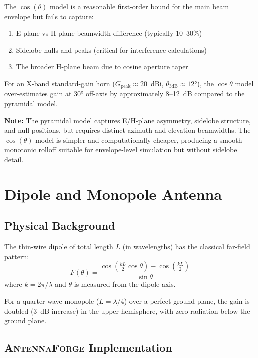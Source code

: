 \documentclass[11pt,a4paper]{article}
\newcommand{\AF}{\textsc{AntennaForge}}
\newcommand{\caveat}[1]{\par\noindent\colorbox{highlightyellow}{\parbox{\dimexpr\linewidth-2\fboxsep\relax}{\textbf{Note:} #1}}\par\medskip}
\begin{document}
The $\cos(\theta)$ model is a reasonable first-order bound for the main beam
envelope but fails to capture:
\begin{enumerate}[leftmargin=2em]
  \item E-plane vs H-plane beamwidth difference (typically 10--30\%)
  \item Sidelobe nulls and peaks (critical for interference calculations)
  \item The broader H-plane beam due to cosine aperture taper
\end{enumerate}

For an X-band standard-gain horn ($G_{\text{peak}} \approx 20$~dBi,
$\theta_{3\text{dB}} \approx 12°$), the $\cos\theta$ model over-estimates gain
at $30°$ off-axis by approximately 8--12~dB compared to the pyramidal model.

\caveat{The pyramidal model captures E/H-plane asymmetry, sidelobe structure,
and null positions, but requires distinct azimuth and elevation beamwidths.
The $\cos(\theta)$ model is simpler and computationally cheaper, producing a
smooth monotonic rolloff suitable for envelope-level simulation but without
sidelobe detail.}

\section{Dipole and Monopole Antenna}
\label{sec:dipole}

\subsection{Physical Background}

The thin-wire dipole of total length $L$ (in wavelengths) has the classical
far-field pattern:
\begin{equation}
  F(\theta) = \frac{\cos\!\left(\frac{kL}{2}\cos\theta\right)
              - \cos\!\left(\frac{kL}{2}\right)}{\sin\theta}
  \label{eq:dipole_classical}
\end{equation}
where $k = 2\pi/\lambda$ and $\theta$ is measured from the dipole axis.

For a quarter-wave monopole ($L = \lambda/4$) over a perfect ground plane, the
gain is doubled (3~dB increase) in the upper hemisphere, with zero radiation
below the ground plane.

\subsection{\AF{} Implementation}
\end{document}
